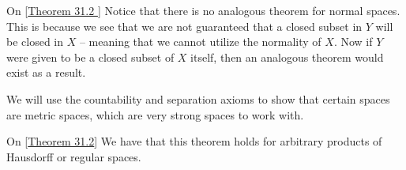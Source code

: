 \begin{remarkBox}{On [\hyperlink{thm:31.2}{Theorem 31.2 }]}
    Notice that there is no analogous theorem for normal spaces.
    This is because we see that we are not guaranteed that a closed subset in
    \( Y \) will be closed in \( X \) -- meaning that we cannot utilize the 
    normality of \( X \).
    Now if \( Y \) were given to be a closed subset of \( X \) itself, then an 
    analogous theorem would exist as a result. 
\end{remarkBox}

\begin{remarkBox}{}
    We will use the countability and separation axioms to show that certain
    spaces are metric spaces, which are very strong spaces to work with.
\end{remarkBox}

\begin{remarkBox}{On [\hyperlink{thm:31.2}{Theorem 31.2}]}
    We have that this theorem holds for arbitrary products of Hausdorff or
    regular spaces.
\end{remarkBox}
